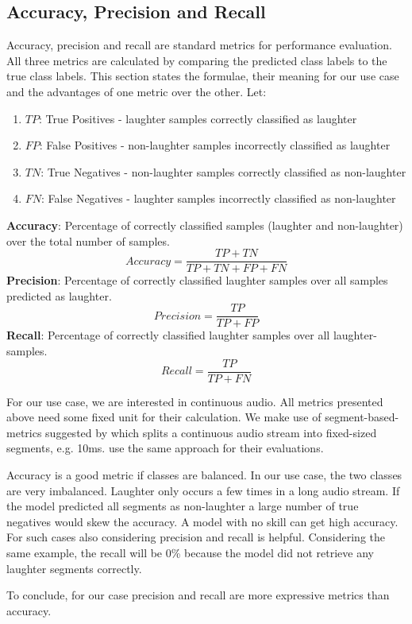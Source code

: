 \documentclass[bsc,frontabs,parskip,deptreport]{infthesis}
\begin{document}
\subsection{Accuracy, Precision and Recall} \label{sec:acc-prec-rec}
Accuracy, precision and recall are standard metrics for performance evaluation.
All three metrics are calculated by comparing the predicted class labels to the true class labels.
This section states the formulae, their meaning for our use case and the advantages of one metric over the other.
Let:
\begin{enumerate}
    \item $TP$: True Positives - laughter samples correctly classified as laughter
    \item $FP$: False Positives - non-laughter samples incorrectly classified as laughter
    \item $TN$: True Negatives - non-laughter samples correctly classified as non-laughter
    \item $FN$: False Negatives - laughter samples incorrectly classified as non-laughter
\end{enumerate}
\textbf{Accuracy}: Percentage of correctly classified samples (laughter and non-laughter) over the total number of samples.
$$Accuracy = \frac{TP+TN}{TP+TN+FP+FN}$$
\textbf{Precision}: Percentage of correctly classified laughter samples over all samples predicted as laughter.
$$Precision = \frac{TP}{TP+FP}$$
\textbf{Recall}: Percentage of correctly classified laughter samples over all laughter-samples.
$$Recall = \frac{TP}{TP+FN}$$

For our use case, we are interested in continuous audio. All metrics presented above need some fixed unit for their calculation. We make use of segment-based-metrics suggested by \citep{mesaros2016metrics} which splits a continuous audio stream into fixed-sized segments, e.g. 10ms. \citeauthor{gillick2021robust} use the same approach for their evaluations.

Accuracy is a good metric if classes are balanced. In our use case, the two classes are very imbalanced. Laughter only occurs a few times in a long audio stream. If the model predicted all segments as non-laughter a large number of true negatives would skew the accuracy. A model with no skill can get high accuracy.
For such cases also considering precision and recall is helpful. Considering the same example, the recall will be 0\% because the model did not retrieve any laughter segments correctly. 

To conclude, for our case precision and recall are more expressive metrics than accuracy.
\end{document}
